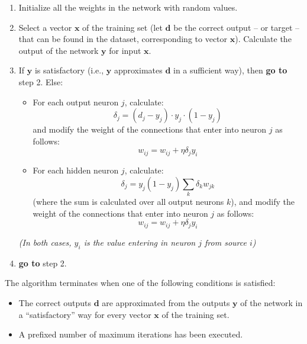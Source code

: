 \begin{enumerate}
    \item Initialize all the weights in the network with random values.
    
    \item Select a vector $\mathbf{x}$ of the training set (let $\mathbf{d}$ be the correct output -- or target -- that can be found in the dataset, corresponding to vector $\mathbf{x}$). Calculate the output of the network $\mathbf{y}$ for input $\mathbf{x}$.
    
    \item If $\mathbf{y}$ is satisfactory (i.e., $\mathbf{y}$ approximates $\mathbf{d}$ in a sufficient way), then \textbf{go to} step 2. Else:
    \begin{itemize}
        \item[\textbf{3.1.}] For each output neuron $j$, calculate:
        \[
        \delta_j = (d_j - y_j) \cdot y_j \cdot (1 - y_j)
        \]
        and modify the weight of the connections that enter into neuron $j$ as follows:
        \[
        w_{ij} = w_{ij} + \eta \delta_j y_i
        \]
        
        \item[\textbf{3.2.}] For each hidden neuron $j$, calculate:
        \[
        \delta_j = y_j (1 - y_j) \sum_{k} \delta_k w_{jk}
        \]
        (where the sum is calculated over all output neurons $k$), and modify the weight of the connections that enter into neuron $j$ as follows:
        \[
        w_{ij} = w_{ij} + \eta \delta_j y_i
        \]
    \end{itemize}
    \textit{(In both cases, $y_i$ is the value entering in neuron $j$ from source $i$)}
    
    \item \textbf{go to} step 2.
\end{enumerate}

The algorithm terminates when one of the following conditions is satisfied:
\begin{itemize}
    \item The correct outputs $\mathbf{d}$ are approximated from the outputs $\mathbf{y}$ of the network in a ``satisfactory'' way for every vector $\mathbf{x}$ of the training set.
    \item A prefixed number of maximum iterations has been executed.
\end{itemize}

\vspace{10pt}

